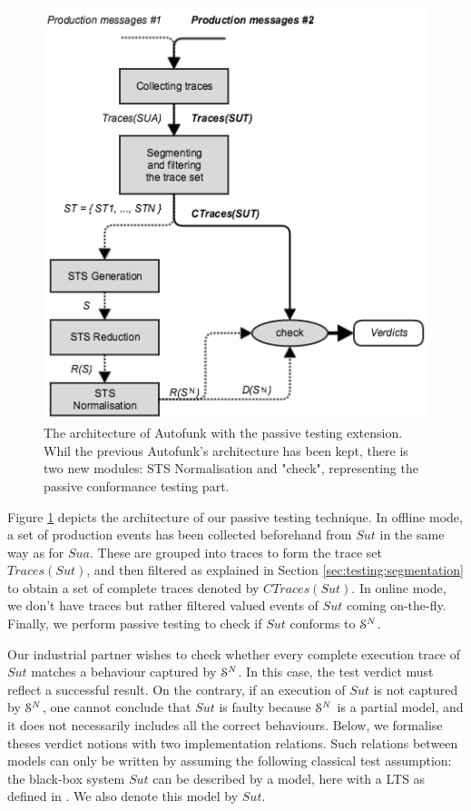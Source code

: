 \begin{figure}[ht]
\includegraphics[width=0.85\linewidth]{figures/passive_autofunk.png}

\caption{The architecture of Autofunk with the passive testing
extension. Whil the previous Autofunk's architecture has been
kept, there is two new modules: STS Normalisation and "check",
representing the passive conformance testing part.}
\label{fig:passive-autofunk}
\end{figure}

Figure \ref{fig:passive-autofunk} depicts the architecture of our
passive testing technique. In offline mode, a set of production
events has been collected beforehand from $\mathit{Sut}$ in the
same way as for $\mathit{Sua}$. These are grouped into traces to
form the trace set $Traces({Sut})$, and then filtered as
explained in Section \ref{sec:testing:segmentation} to obtain a
set of complete traces denoted by $CTraces({Sut})$. In online
mode, we don't have traces but rather filtered valued events of
$\mathit{Sut}$ coming on-the-fly. Finally, we perform passive
testing to check if $\mathit{Sut}$ conforms to
$\EuScript{S}^{N}$.


Our industrial partner wishes to check whether every complete
execution trace of $\mathit{Sut}$ matches a behaviour captured by
$\EuScript{S}^{N}$. In this case, the test verdict must reflect a
successful result. On the contrary, if an execution of
$\mathit{Sut}$ is not captured by $\EuScript{S}^{N}$, one cannot
conclude that $\mathit{Sut}$ is faulty because $\EuScript{S}^{N}$
is a partial model, and it does not necessarily includes all the
correct behaviours. Below, we formalise theses verdict notions
with two implementation relations. Such relations between models
can only be written by assuming the following classical test
assumption: the black-box system $\mathit{Sut}$ can be described
by a model, here with a LTS as defined in
. We also
denote this model by $\mathit{Sut}$.

